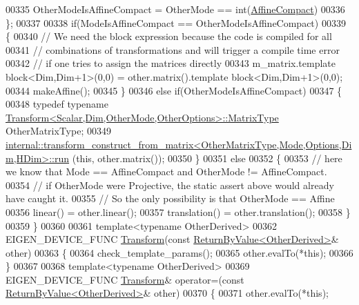 \begin{DoxyCode}
00335            OtherModeIsAffineCompact = OtherMode == int(\hyperlink{group__enums_ggaee59a86102f150923b0cac6d4ff05107aa30a06b60d218b709020972df47de2b0}{AffineCompact})
00336     \};
00337 
00338     \textcolor{keywordflow}{if}(ModeIsAffineCompact == OtherModeIsAffineCompact)
00339     \{
00340       \textcolor{comment}{// We need the block expression because the code is compiled for all}
00341       \textcolor{comment}{// combinations of transformations and will trigger a compile time error}
00342       \textcolor{comment}{// if one tries to assign the matrices directly}
00343       m\_matrix.template block<Dim,Dim+1>(0,0) = other.matrix().template block<Dim,Dim+1>(0,0);
00344       makeAffine();
00345     \}
00346     \textcolor{keywordflow}{else} \textcolor{keywordflow}{if}(OtherModeIsAffineCompact)
00347     \{
00348       \textcolor{keyword}{typedef} \textcolor{keyword}{typename} \hyperlink{group___core___module_class_eigen_1_1_matrix}{Transform<Scalar,Dim,OtherMode,OtherOptions>::MatrixType}
       OtherMatrixType;
00349       
      \hyperlink{struct_eigen_1_1internal_1_1transform__construct__from__matrix}{internal::transform\_construct\_from\_matrix<OtherMatrixType,Mode,Options,Dim,HDim>::run}
      (\textcolor{keyword}{this}, other.matrix());
00350     \}
00351     \textcolor{keywordflow}{else}
00352     \{
00353       \textcolor{comment}{// here we know that Mode == AffineCompact and OtherMode != AffineCompact.}
00354       \textcolor{comment}{// if OtherMode were Projective, the static assert above would already have caught it.}
00355       \textcolor{comment}{// So the only possibility is that OtherMode == Affine}
00356       linear() = other.linear();
00357       translation() = other.translation();
00358     \}
00359   \}
00360 
00361   \textcolor{keyword}{template}<\textcolor{keyword}{typename} OtherDerived>
00362   EIGEN\_DEVICE\_FUNC \hyperlink{group___geometry___module_class_eigen_1_1_transform}{Transform}(\textcolor{keyword}{const} \hyperlink{group___core___module_class_eigen_1_1_return_by_value}{ReturnByValue<OtherDerived>}& other)
00363   \{
00364     check\_template\_params();
00365     other.evalTo(*\textcolor{keyword}{this});
00366   \}
00367 
00368   \textcolor{keyword}{template}<\textcolor{keyword}{typename} OtherDerived>
00369   EIGEN\_DEVICE\_FUNC \hyperlink{group___geometry___module_class_eigen_1_1_transform}{Transform}& operator=(\textcolor{keyword}{const} 
      \hyperlink{group___core___module_class_eigen_1_1_return_by_value}{ReturnByValue<OtherDerived>}& other)
00370   \{
00371     other.evalTo(*\textcolor{keyword}{this});

\end{DoxyCode}
